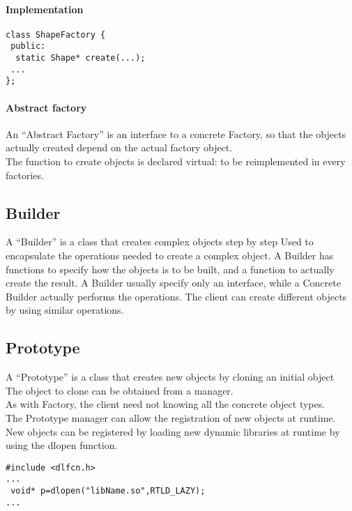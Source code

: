 \documentclass{article}
\begin{document}
\paragraph{Implementation}
\begin{lstlisting}
class ShapeFactory {
 public:
  static Shape* create(...);
 ...
};
\end{lstlisting}

\paragraph{Abstract factory}
An “Abstract Factory” is an interface to a concrete Factory, so that the objects actually created depend on the actual factory object. \\
The function to create objects is declared virtual: to be reimplemented in every factories.






\subsection{Builder}
A “Builder” is a class that creates complex objects
step by step
Used to encapsulate the operations needed to create a
complex object.
A Builder has functions to specify how the objects is to be
built, and a function to actually create the result.
A Builder usually specify only an interface, while a
Concrete Builder actually performs the operations.
The client can create different objects by using similar
operations.




\subsection{Prototype}
A “Prototype” is a class that creates new objects
by cloning an initial object \\
The object to clone can be obtained from a manager.\\ 
As with Factory, the client need not knowing all the 
concrete object types. \\
The Prototype manager can allow the registration of new
objects at runtime.\\
New objects can be registered by loading new dynamic
libraries at runtime by using the dlopen function. \\
\begin{lstlisting}
#include <dlfcn.h>
...
 void* p=dlopen("libName.so",RTLD_LAZY);
...
\end{lstlisting}
\end{document}
